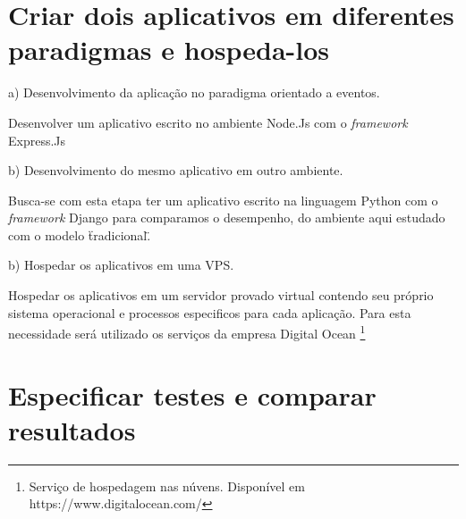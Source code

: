 \section{Criar dois aplicativos em diferentes paradigmas e hospeda-los}
  
  \begin{compactitem}
    \item[a)] Desenvolvimento da aplicação no paradigma orientado a eventos.
    
    Desenvolver um aplicativo escrito no ambiente Node.Js com o \textit{framework} Express.Js
    
    \item[b)] Desenvolvimento do mesmo aplicativo em outro ambiente.
    
    Busca-se com esta etapa ter um aplicativo escrito na linguagem Python com o \textit{framework} Django
    para comparamos o desempenho, do ambiente aqui estudado com o modelo \"tradicional\".
    
    \item[b)] Hospedar os aplicativos em uma VPS.
    
    Hospedar os aplicativos em um servidor provado virtual contendo seu próprio sistema operacional e processos
    especificos para cada aplicação. Para esta necessidade será utilizado os serviços da empresa Digital Ocean \footnote{
    Serviço de hospedagem nas núvens. Disponível em https://www.digitalocean.com/}
    
  \end{compactitem}

\section{Especificar testes e comparar resultados}

